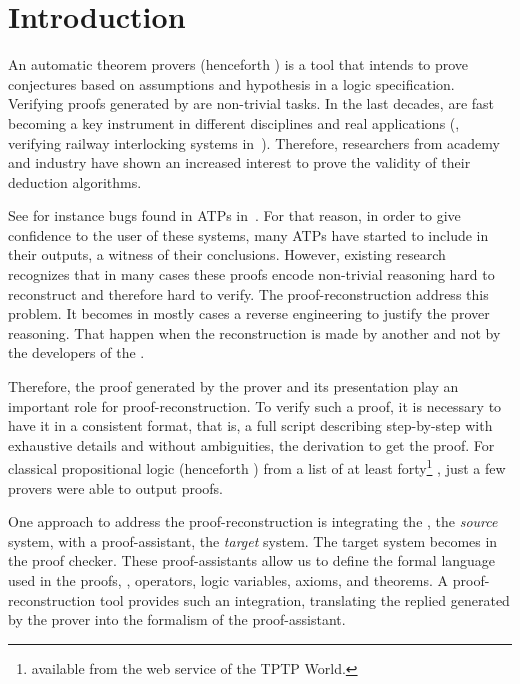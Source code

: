 \documentclass[../main.tex]{subfiles}
\begin{document}

\section{Introduction}
\label{sec:introduction}

An automatic theorem provers (henceforth \ATP) is a tool that intends to prove
conjectures based on assumptions and hypothesis in a logic specification.
Verifying proofs generated by \ATPs are non-trivial tasks.
In the last decades, \ATPs are fast becoming a key instrument in
different disciplines and real applications (\eg, verifying railway interlocking systems in~\cite{Kanso2012}).
Therefore, researchers from academy and industry have shown an increased interest to prove the validity of their deduction algorithms.

See for instance bugs found in ATPs in~\cite{Keller2013,Bohme2011,Fleury2014}.
For that reason, in order to give confidence to the user of these systems,
many ATPs have started to include in their outputs, a witness of their
conclusions. However, existing research recognizes that in many cases these proofs encode non-trivial reasoning
hard to reconstruct and therefore hard to verify. The proof-reconstruction
address this problem.
It becomes in mostly cases a reverse engineering to justify the prover reasoning.
That happen when the reconstruction is made by another and not by
the developers of the \ATP.

Therefore, the proof generated by the prover and its presentation play an important role for proof-reconstruction. To verify such a proof, it is necessary to have
it in a consistent format, that is, a full script
describing step-by-step with exhaustive details and without ambiguities, the derivation to get the proof.
For classical propositional logic (henceforth \CPL) from a list of at least forty\footnote{\ATPs
available from the web
service  of the TPTP World.} \ATPs, just a few
provers were able to output proofs.

One approach to address the proof-reconstruction
is integrating the \ATP, the \emph{source} system, with a proof-assistant, the
\emph{target} system.
The target system becomes in the proof checker. These proof-assistants allow
us to define the formal language used in the proofs, \ie, operators, logic
variables, axioms, and theorems. A proof-reconstruction tool provides such an
integration, translating the replied generated by the prover into the formalism of the proof-assistant.
\end{document}

